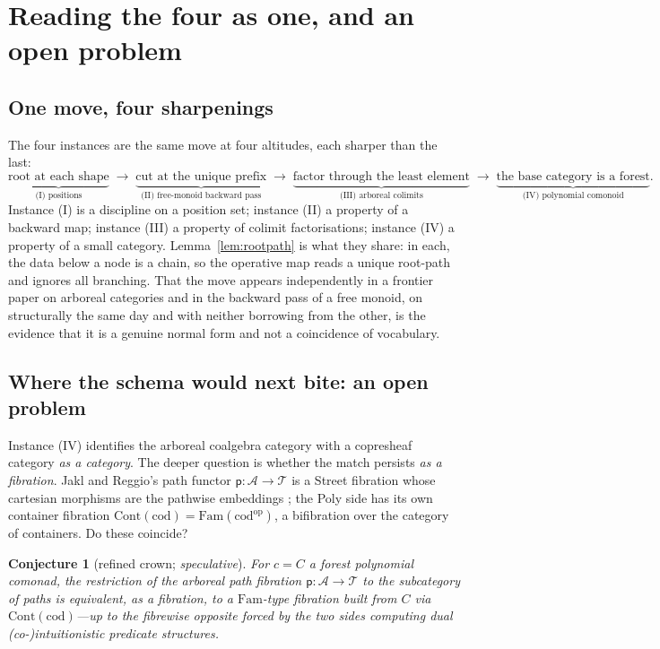 \documentclass[11pt,reqno]{amsart}
\theoremstyle{plain}
\newtheorem{conjecture}[theorem]{Conjecture}
\theoremstyle{definition}
\newcommand{\Cont}{\mathrm{Cont}}
\newcommand{\Fam}{\mathrm{Fam}}
\newcommand{\cod}{\mathrm{cod}}
\newcommand{\pathfun}{\mathsf{p}}
\newcommand{\A}{\mathcal{A}}
\newcommand{\T}{\mathcal{T}}
\newcommand{\op}{\mathrm{op}}
\begin{document}
\section{Reading the four as one, and an open problem}\label{sec:open}

\subsection{One move, four sharpenings}
The four instances are the same move at four altitudes, each sharper than the last:
\[
  \underbrace{\text{root at each shape}}_{\text{(I) positions}}
  \;\longrightarrow\;
  \underbrace{\text{cut at the unique prefix}}_{\text{(II) free-monoid backward pass}}
  \;\longrightarrow\;
  \underbrace{\text{factor through the least element}}_{\text{(III) arboreal colimits}}
  \;\longrightarrow\;
  \underbrace{\text{the base category is a forest}}_{\text{(IV) polynomial comonoid}}.
\]
Instance (I) is a discipline on a position set; instance (II) a property of a backward map; instance (III)
a property of colimit factorisations; instance (IV) a property of a small category. Lemma~\ref{lem:rootpath}
is what they share: in each, the data below a node is a chain, so the operative map reads a unique
root-path and ignores all branching. That the move appears independently in a frontier paper on arboreal
categories \cite{JaklReggio2026} and in the backward pass of a free monoid, on structurally the same day
and with neither borrowing from the other, is the evidence that it is a genuine normal form and not a
coincidence of vocabulary.

\subsection{Where the schema would next bite: an open problem}
Instance (IV) identifies the arboreal coalgebra category with a copresheaf category \emph{as a category}.
The deeper question is whether the match persists \emph{as a fibration}. Jakl and Reggio's path functor
$\pathfun : \A \to \T$ is a Street fibration whose cartesian morphisms are the pathwise embeddings
\cite[Thm.~23, Thm.~26]{JaklReggio2026}; the Poly side has its own container fibration
$\Cont(\cod) = \Fam(\cod^{\op})$, a bifibration over the category of containers. Do these coincide?

\begin{conjecture}[refined crown; \emph{speculative}]\label{conj:crown}
For $c = C$ a forest polynomial comonad, the restriction of the arboreal path fibration
$\pathfun : \A \to \T$ to the subcategory of paths is equivalent, as a fibration, to a $\Fam$-type
fibration built from $C$ via $\Cont(\cod)$---up to the fibrewise opposite forced by the two sides
computing dual (co-)intuitionistic predicate structures.
\end{conjecture}
\end{document}
